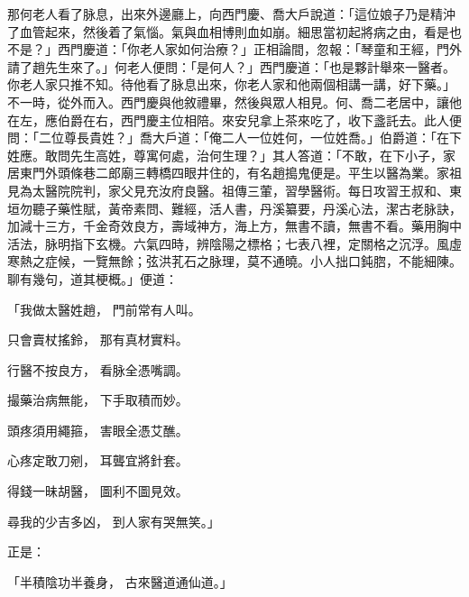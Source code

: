 那何老人看了脉息，出來外邊廳上，向西門慶、喬大戶說道：「這位娘子乃是精沖了血管起來，然後着了氣惱。氣與血相博則血如崩。細思當初起將病之由，看是也不是？」西門慶道：「你老人家如何治療？」正相論間，忽報：「琴童和王經，門外請了趙先生來了。」何老人便問：「是何人？」西門慶道：「也是夥計舉來一醫者。你老人家只推不知。待他看了脉息出來，你老人家和他兩個相講一講，好下藥。」不一時，從外而入。西門慶與他敘禮畢，然後與眾人相見。何、喬二老居中，讓他在左，應伯爵在右，西門慶主位相陪。來安兒拿上茶來吃了，收下盞託去。此人便問：「二位尊長貴姓？」喬大戶道：「俺二人一位姓何，一位姓喬。」伯爵道：「在下姓應。敢問先生高姓，尊寓何處，治何生理？」其人答道：「不敢，在下小子，家居東門外頭條巷二郎廟三轉橋四眼井住的，有名趙搗鬼便是。平生以醫為業。家祖見為太醫院院判，家父見充汝府良醫。祖傳三葷，習學醫術。每日攻習王叔和、東垣勿聽子藥性賦，黃帝素問、難經，活人書，丹溪纂要，丹溪心法，潔古老脉訣，加減十三方，千金奇效良方，壽域神方，海上方，無書不讀，無書不看。藥用胸中活法，脉明指下玄機。六氣四時，辨陰陽之標格；七表八裡，定關格之沉浮。風虛寒熱之症候，一覽無餘；弦洪芤石之脉理，莫不通曉。小人拙口鈍脗，不能細陳。聊有幾句，道其梗概。」便道：

「我做太醫姓趙，  門前常有人叫。

只會賣杖搖鈴，  那有真材實料。

行醫不按良方，  看脉全憑嘴調。

撮藥治病無能，  下手取積而妙。

頭疼須用繩箍，  害眼全憑艾醮。

心疼定敢刀剜，  耳聾宜將針套。

得錢一昧胡醫，  圖利不圖見效。

尋我的少吉多凶，  到人家有哭無笑。」

正是：

「半積陰功半養身，  古來醫道通仙道。」

